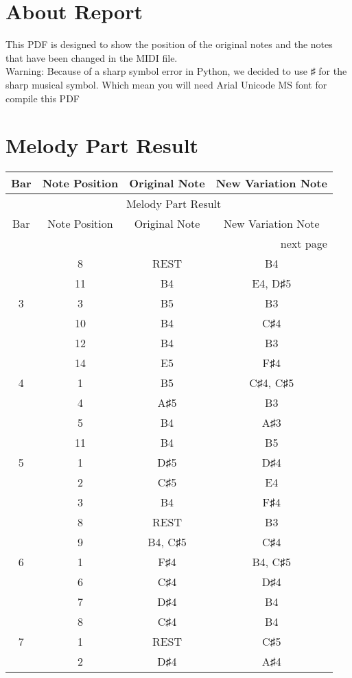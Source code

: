 \documentclass{article}
\begin{document}
\section*{About Report}
This PDF is designed to show the position of the original notes and the notes that have been changed in the MIDI file. \\
Warning: Because of a sharp symbol error in Python, we decided to use ♯ for the sharp musical symbol. Which mean you will need Arial Unicode MS font for compile this PDF
\section*{Melody Part Result}\begin{longtable}{|c|c|c|c|}
\hline
Bar & Note Position & Original Note & New Variation Note \\ \hline
\endfirsthead
\multicolumn{4}{c}{{\tablename\ \thetable{} Melody Part Result}} \\
\hline
Bar & Note Position & Original Note & New Variation Note \\ \hline
\hline
\endhead
\hline
\multicolumn{4}{r}{next page}\endfoot
\hline
\endlastfoot
\hline
2 & 4 & A♯5 & D♯5 \\ 
  & 8 & REST & B4 \\ 
  & 11 & B4 & E4, D♯5 \\ 
\hline
3 & 3 & B5 & B3 \\ 
  & 10 & B4 & C♯4 \\ 
  & 12 & B4 & B3 \\ 
  & 14 & E5 & F♯4 \\ 
\hline
4 & 1 & B5 & C♯4, C♯5 \\ 
  & 4 & A♯5 & B3 \\ 
  & 5 & B4 & A♯3 \\ 
  & 11 & B4 & B5 \\ 
\hline
5 & 1 & D♯5 & D♯4 \\ 
  & 2 & C♯5 & E4 \\ 
  & 3 & B4 & F♯4 \\ 
  & 8 & REST & B3 \\ 
  & 9 & B4, C♯5 & C♯4 \\ 
\hline
6 & 1 & F♯4 & B4, C♯5 \\ 
  & 6 & C♯4 & D♯4 \\ 
  & 7 & D♯4 & B4 \\ 
  & 8 & C♯4 & B4 \\ 
\hline
7 & 1 & REST & C♯5 \\ 
  & 2 & D♯4 & A♯4 \\ 

\end{longtable}
\end{document}
